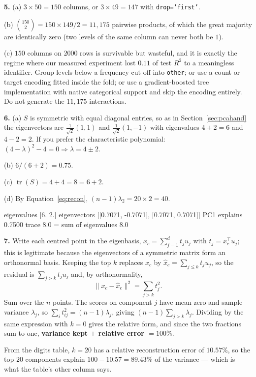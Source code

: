 \documentclass[11pt]{article}
\begin{document}
\medskip
\textbf{5.} (a) $3 \times 50 = 150$ columns, or $3 \times 49 = 147$ with
\texttt{drop='first'}.

(b) $\binom{150}{2} = 150 \times 149 / 2 = 11{,}175$ pairwise products, of
which the great majority are identically zero (two levels of the same column
can never both be $1$).

(c) $150$ columns on $2000$ rows is survivable but wasteful, and it is exactly
the regime where our measured experiment lost $0.11$ of test $R^2$ to a
meaningless identifier. Group levels below a frequency cut-off into
\texttt{other}; or use a count or target encoding fitted inside the fold; or
use a gradient-boosted tree implementation with native categorical support and
skip the encoding entirely. Do not generate the $11{,}175$ interactions.

\medskip
\textbf{6.} (a) $S$ is symmetric with equal diagonal entries, so as in
Section~\ref{sec:pcahand} the eigenvectors are $\frac{1}{\sqrt2}(1,1)$ and
$\frac{1}{\sqrt2}(1,-1)$ with eigenvalues $4+2 = 6$ and $4-2 = 2$. If you
prefer the characteristic polynomial:
$(4-\lambda)^2 - 4 = 0 \Rightarrow \lambda = 4 \pm 2$.

(b) $6/(6+2) = 0.75$.

(c) $\operatorname{tr}(S) = 4 + 4 = 8 = 6 + 2$.

(d) By Equation~\eqref{eq:recon}, $(n-1)\lambda_2 = 20 \times 2 = 40$.

\begin{codeout}
eigenvalues [6. 2.]   eigenvectors [[0.7071, -0.7071], [0.7071, 0.7071]]
PC1 explains 0.7500   trace 8.0 = sum of eigenvalues 8.0
\end{codeout}

\medskip
\textbf{7.} Write each centred point in the eigenbasis,
$x_c = \sum_{j=1}^{d} t_j u_j$ with $t_j = x_c^{\!\top}u_j$; this is legitimate
because the eigenvectors of a symmetric matrix form an orthonormal basis.
Keeping the top $k$ replaces $x_c$ by $\hat x_c = \sum_{j\le k} t_j u_j$, so
the residual is $\sum_{j>k} t_j u_j$ and, by orthonormality,
\[
  \|x_c - \hat x_c\|^2 = \sum_{j>k} t_j^2 .
\]
Sum over the $n$ points. The scores on component $j$ have mean zero and sample
variance $\lambda_j$, so $\sum_{i} t_{ij}^2 = (n-1)\lambda_j$, giving
$(n-1)\sum_{j>k}\lambda_j$. Dividing by the same expression with $k = 0$ gives
the relative form, and since the two fractions sum to one, \textbf{variance
kept $+$ relative error $= 100\%$}.

From the digits table, $k = 20$ has a relative reconstruction error of
$10.57\%$, so the top $20$ components explain $100 - 10.57 = 89.43\%$ of the
variance --- which is what the table's other column says.
\end{document}

